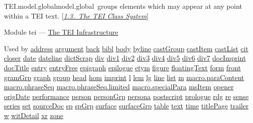 \begin{reflist}
\item[]\begin{specHead}{TEI.model.global}{model.global} groups elements which may appear at any point within a TEI text. [\textit{\hyperref[STEC]{1.3.\ The TEI Class System}}]\end{specHead} 
    \item[{Module}]
  tei — \hyperref[ST]{The TEI Infrastructure}
    \item[{Used by}]
  \hyperref[TEI.address]{address} \hyperref[TEI.argument]{argument} \hyperref[TEI.back]{back} \hyperref[TEI.bibl]{bibl} \hyperref[TEI.body]{body} \hyperref[TEI.byline]{byline} \hyperref[TEI.castGroup]{castGroup} \hyperref[TEI.castItem]{castItem} \hyperref[TEI.castList]{castList} \hyperref[TEI.cit]{cit} \hyperref[TEI.closer]{closer} \hyperref[TEI.date]{date} \hyperref[TEI.dateline]{dateline} \hyperref[TEI.dictScrap]{dictScrap} \hyperref[TEI.div]{div} \hyperref[TEI.div1]{div1} \hyperref[TEI.div2]{div2} \hyperref[TEI.div3]{div3} \hyperref[TEI.div4]{div4} \hyperref[TEI.div5]{div5} \hyperref[TEI.div6]{div6} \hyperref[TEI.div7]{div7} \hyperref[TEI.docImprint]{docImprint} \hyperref[TEI.docTitle]{docTitle} \hyperref[TEI.entry]{entry} \hyperref[TEI.entryFree]{entryFree} \hyperref[TEI.epigraph]{epigraph} \hyperref[TEI.epilogue]{epilogue} \hyperref[TEI.etym]{etym} \hyperref[TEI.figure]{figure} \hyperref[TEI.floatingText]{floatingText} \hyperref[TEI.form]{form} \hyperref[TEI.front]{front} \hyperref[TEI.gramGrp]{gramGrp} \hyperref[TEI.graph]{graph} \hyperref[TEI.group]{group} \hyperref[TEI.head]{head} \hyperref[TEI.hom]{hom} \hyperref[TEI.imprint]{imprint} \hyperref[TEI.l]{l} \hyperref[TEI.lem]{lem} \hyperref[TEI.lg]{lg} \hyperref[TEI.line]{line} \hyperref[TEI.list]{list} \hyperref[TEI.m]{m} \hyperref[TEI.macro.paraContent]{macro.paraContent} \hyperref[TEI.macro.phraseSeq]{macro.phraseSeq} \hyperref[TEI.macro.phraseSeq.limited]{macro.phraseSeq.limited} \hyperref[TEI.macro.specialPara]{macro.specialPara} \hyperref[TEI.msItem]{msItem} \hyperref[TEI.opener]{opener} \hyperref[TEI.origDate]{origDate} \hyperref[TEI.performance]{performance} \hyperref[TEI.person]{person} \hyperref[TEI.personGrp]{personGrp} \hyperref[TEI.persona]{persona} \hyperref[TEI.postscript]{postscript} \hyperref[TEI.prologue]{prologue} \hyperref[TEI.rdg]{rdg} \hyperref[TEI.re]{re} \hyperref[TEI.sense]{sense} \hyperref[TEI.series]{series} \hyperref[TEI.set]{set} \hyperref[TEI.sourceDoc]{sourceDoc} \hyperref[TEI.sp]{sp} \hyperref[TEI.spGrp]{spGrp} \hyperref[TEI.surface]{surface} \hyperref[TEI.surfaceGrp]{surfaceGrp} \hyperref[TEI.table]{table} \hyperref[TEI.text]{text} \hyperref[TEI.time]{time} \hyperref[TEI.titlePage]{titlePage} \hyperref[TEI.trailer]{trailer} \hyperref[TEI.w]{w} \hyperref[TEI.witDetail]{witDetail} \hyperref[TEI.xr]{xr} \hyperref[TEI.zone]{zone}

\end{reflist}
